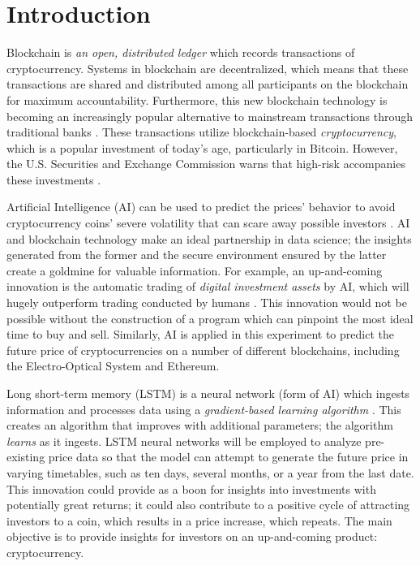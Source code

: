 
\section{Introduction}

Blockchain is {\em an open, distributed ledger} which records transactions of cryptocurrency. Systems in blockchain are decentralized, which means that these transactions are shared and distributed among all participants on the blockchain for maximum accountability. Furthermore, this new blockchain technology is becoming an increasingly popular alternative to mainstream transactions through traditional banks \cite{c2}. These transactions utilize blockchain-based {\em cryptocurrency}, which is a popular investment of today's age, particularly in Bitcoin. However, the U.S. Securities and Exchange Commission warns that high-risk accompanies these investments \cite{c1}. 

Artificial Intelligence (AI) can be used to predict the prices' behavior to avoid cryptocurrency coins' severe volatility that can scare away possible investors \cite{c3}. AI and blockchain technology make an ideal partnership in data science; the insights generated from the former and the secure environment ensured by the latter create a goldmine for valuable information. For example, an up-and-coming innovation is the automatic trading of {\em digital investment assets} by AI, which will hugely outperform trading conducted by humans \cite{c5}. This innovation would not be possible without the construction of a program which can pinpoint the most ideal time to buy and sell. Similarly, AI is applied in this experiment to predict the future price of cryptocurrencies on a number of different blockchains, including the Electro-Optical System and Ethereum. 

Long short-term memory (LSTM) is a neural network (form of AI) which ingests information and processes data using a {\em gradient-based learning algorithm} \cite{c6}. This creates an algorithm that improves with additional parameters; the algorithm {\em learns} as it ingests. LSTM neural networks will be employed to analyze pre-existing price data so that the model can attempt to generate the future price in varying timetables, such as ten days, several months, or a year from the last date. This innovation could provide as a boon for insights into investments with potentially great returns; it could also contribute to a positive cycle of attracting investors to a coin, which results in a price increase, which repeats. The main objective is to provide insights for investors on an up-and-coming product: cryptocurrency.

